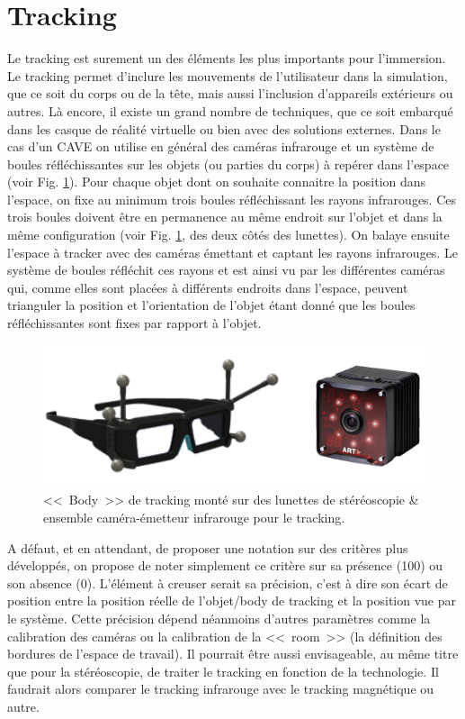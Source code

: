 	\section{Tracking}
	\par Le tracking est surement un des éléments les plus importants pour l'immersion. Le tracking permet d'inclure les mouvements de l'utilisateur dans la simulation, que ce soit du corps ou de la tête, mais aussi l'inclusion d'appareils extérieurs ou autres. Là encore, il existe un grand nombre de techniques, que ce soit embarqué dans les casque de réalité virtuelle ou bien avec des solutions externes. Dans le cas d'un CAVE on utilise en général des caméras infrarouge et un système de boules réfléchissantes sur les objets (ou parties du corps) à repérer dans l'espace (voir Fig. \ref{fig:tracking_illustration}). Pour chaque objet dont on souhaite connaitre la position dans l'espace, on fixe au minimum trois boules réfléchissant les rayons infrarouges. Ces trois boules doivent être en permanence au même endroit sur l'objet et dans la même configuration (voir Fig. \ref{fig:tracking_illustration}, des deux côtés des lunettes). On balaye ensuite l'espace à tracker avec des caméras émettant et captant les rayons infrarouges. Le système de boules réfléchit ces rayons et est ainsi vu par les différentes caméras qui, comme elles sont placées à différents endroits dans l'espace, peuvent trianguler la position et l'orientation de l'objet étant donné que les boules réfléchissantes sont fixes par rapport à l'objet.
	
	\begin{figure}[h]
		\centering
		\includegraphics[scale=.6]{Figures/TrackingCameraBody}
		\caption{<<~Body~>> de tracking monté sur des lunettes de stéréoscopie \& ensemble caméra-émetteur infrarouge pour le tracking.}
		\label{fig:tracking_illustration}
	\end{figure}
	
	\par A défaut, et en attendant, de proposer une notation sur des critères plus développés, on propose de noter simplement ce critère sur sa présence (100) ou son absence (0). L'élément à creuser serait sa précision, c'est à dire son écart de position entre la position réelle de l'objet/body de tracking et la position vue par le système. Cette précision dépend néanmoins d'autres paramètres comme la calibration des caméras ou la calibration de la <<~room~>> (la définition des bordures de l'espace de travail). Il pourrait être aussi envisageable, au même titre que pour la stéréoscopie, de traiter le tracking en fonction de la technologie. Il faudrait alors comparer le tracking infrarouge avec le tracking magnétique ou autre.
		

